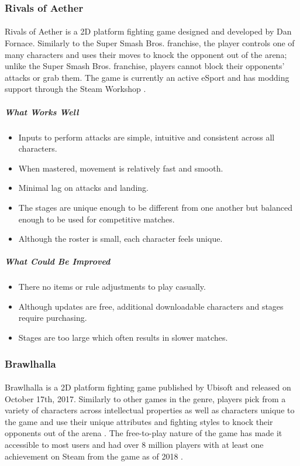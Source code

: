 \subsubsection{Rivals of Aether}

\paragraph{} Rivals of Aether is a 2D platform fighting game designed and developed by Dan Fornace. Similarly to the Super Smash Bros. franchise, the player controls one of many characters and uses their moves to knock the opponent out of the arena; unlike the Super Smash Bros. franchise, players cannot block their opponents' attacks or grab them. The game is currently an active eSport and has modding support through the Steam Workshop \autocite{fornace_rivals_2017}.

\subparagraph{What Works Well}

\begin{itemize}
    \item Inputs to perform attacks are simple, intuitive and consistent across all characters.
    \item When mastered, movement is relatively fast and smooth.
    \item Minimal lag on attacks and landing.
    \item The stages are unique enough to be different from one another but balanced enough to be used for competitive matches.
    \item Although the roster is small, each character feels unique.
\end{itemize}

\subparagraph{What Could Be Improved}

\begin{itemize}
    \item There no items or rule adjustments to play casually.
    \item Although updates are free, additional downloadable characters and stages require purchasing.
    \item Stages are too large which often results in slower matches.
\end{itemize}

\subsubsection{Brawlhalla}

\paragraph{} Brawlhalla is a 2D platform fighting game published by Ubisoft and released on October 17th, 2017. Similarly to other games in the genre, players pick from a variety of characters across intellectual properties as well as characters unique to the game and use their unique attributes and fighting styles to knock their opponents out of the arena \autocite{blue_mammoth_games_brawlhalla_2017}. The free-to-play nature of the game has made it accessible to most users and had over 8 million players with at least one achievement on Steam from the game as of 2018 \autocite{orland_valve_2018}.

